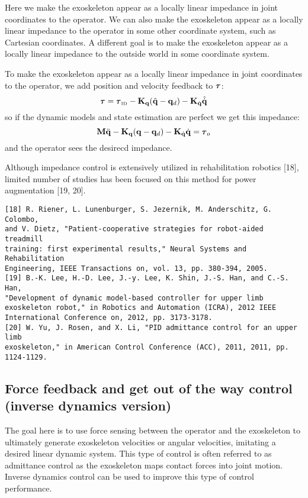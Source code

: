 \documentclass[letterpaper,12pt,fullpage]{article}
\newcommand{\invdyn}{{\mbox {\tiny ID}}}
\begin{document}
Here we make the exoskeleton appear as a locally linear impedance in joint
coordinates to the operator.
We can also make the exoskeleton appear as a locally linear impedance to the
operator in some other coordinate system, such as Cartesian coordinates.
A different goal is to make the exoskeleton appear as a locally linear impedance to
the outside world in some coordinate system.

To make the exoskeleton appear as a locally linear impedance in joint
coordinates to the operator, we add position and velocity feedback to $\vtau$:
\begin{equation}
\vtau = \vtau_{\invdyn} - \mK_{\vq} ( \hat{\vq} - \vq_d ) - \mK_{\dot{\vq}} \hat{\dot{\vq}}
\label{eq:impedance}
\end{equation}
so if the dynamic models and state estimation are perfect we get this impedance:
\begin{equation}
\mM \ddot{\vq} - \mK_{\vq} ( \vq - \vq_d ) - \mK_{\dot{\vq}} \dot{\vq} = \vtau_o
\end{equation}
and the operator sees the desirecd impedance.

Although impedance control is extensively utilized in rehabilitation
robotics [18], limited number of studies has been focused on
this method for power augmentation [19, 20].
\begin{verbatim}
[18] R. Riener, L. Lunenburger, S. Jezernik, M. Anderschitz, G. Colombo,
and V. Dietz, "Patient-cooperative strategies for robot-aided treadmill
training: first experimental results," Neural Systems and Rehabilitation
Engineering, IEEE Transactions on, vol. 13, pp. 380-394, 2005.
[19] B.-K. Lee, H.-D. Lee, J.-y. Lee, K. Shin, J.-S. Han, and C.-S. Han,
"Development of dynamic model-based controller for upper limb
exoskeleton robot," in Robotics and Automation (ICRA), 2012 IEEE
International Conference on, 2012, pp. 3173-3178.
[20] W. Yu, J. Rosen, and X. Li, "PID admittance control for an upper limb
exoskeleton," in American Control Conference (ACC), 2011, 2011, pp.
1124-1129.
\end{verbatim}

\subsection{Force feedback and get out of the way control (inverse dynamics version)}

The goal here is to use force sensing between the operator and the
exoskeleton to ultimately generate exoskeleton velocities or angular velocities,
imitating a desired linear dynamic system.
This type of control is often referred to as admittance control as the
exoskeleton maps contact forces into joint motion.
Inverse dynamics control
can be used to improve this type of control performance.
\end{document}
